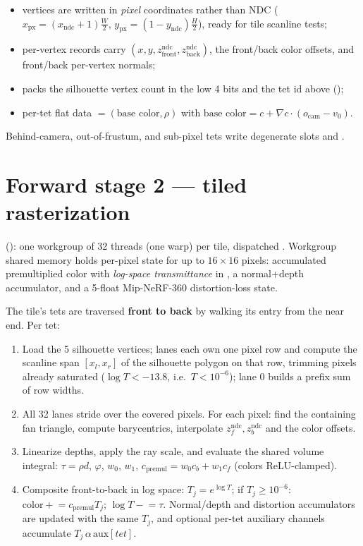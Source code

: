 \begin{itemize}
\item vertices are written in \emph{pixel} coordinates rather than NDC
  ($x_{\text{px}} = (x_{\text{ndc}}+1)\frac{W}{2}$,
  $y_{\text{px}} = (1-y_{\text{ndc}})\frac{H}{2}$), ready for tile scanline
  tests;
\item per-vertex records carry
  $(x, y, z^{\text{ndc}}_{\text{front}}, z^{\text{ndc}}_{\text{back}})$,
  the front/back color offsets, and front/back per-vertex normals;
\item {} packs the silhouette vertex count in the
  low 4 bits and the tet id above
  ();
\item per-tet flat data  $=
  (\text{base color}, \rho)$ with
  $\text{base color} = c + \nabla c \cdot (o_{\text{cam}} - v_0)$.
\end{itemize}

Behind-camera, out-of-frustum, and sub-pixel tets write degenerate slots and
.

\section{Forward stage 2 --- tiled rasterization}

(): one workgroup of 32 threads (one
warp) per tile, dispatched . Workgroup shared memory
holds per-pixel state for up to $16\times16$ pixels: accumulated
premultiplied color with \emph{log-space transmittance} in ,
a normal+depth accumulator, and a 5-float Mip-NeRF-360 distortion-loss
state.

The tile's tets are traversed \textbf{front to back} by walking its
 entry from the near end. Per tet:

\begin{enumerate}
\item Load the 5 silhouette vertices; lanes each own one pixel row and
  compute the scanline span $[x_l, x_r]$ of the silhouette polygon on that
  row, trimming pixels already saturated
  ($\log T < -13.8$, i.e.\ $T < 10^{-6}$); lane 0 builds a prefix sum of row
  widths.
\item All 32 lanes stride over the covered pixels. For each pixel: find the
  containing fan triangle, compute barycentrics, interpolate
  $z^{\text{ndc}}_{f}, z^{\text{ndc}}_{b}$ and the color offsets.
\item Linearize depths, apply the ray scale, and evaluate the shared volume
  integral: $\tau = \rho d$, $\varphi$, $w_0$, $w_1$,
  $c_{\text{premul}} = w_0 c_b + w_1 c_f$ (colors ReLU-clamped).
\item Composite front-to-back in log space:
  $T_j = e^{\log T}$; if $T_j \ge 10^{-6}$:
  $\text{color} \mathrel{+}= c_{\text{premul}} T_j$;
  $\log T \mathrel{-}= \tau$. Normal/depth and distortion accumulators are
  updated with the same $T_j$, and optional per-tet auxiliary channels
  accumulate $T_j\,\alpha\,\text{aux}[tet]$.
\end{enumerate}

